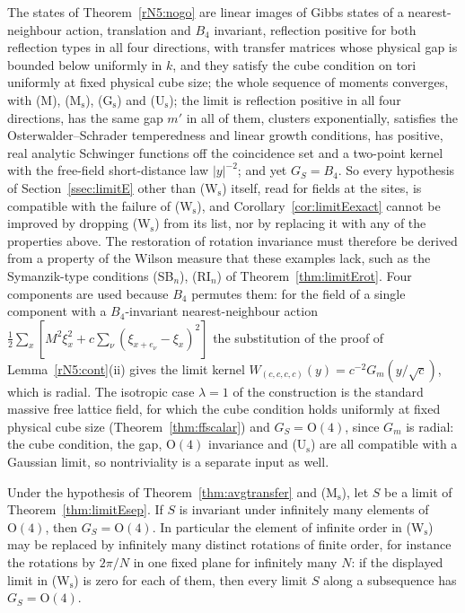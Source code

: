 \begin{remark}\label{rN5:rem:nogo}
The states of Theorem~\ref{rN5:nogo} are linear images of Gibbs states of a
nearest-neighbour action, translation and $B_4$ invariant, reflection
positive for both reflection types in all four directions, with transfer
matrices whose physical gap is bounded below uniformly in $k$, and they
satisfy the cube condition on tori uniformly at fixed physical cube size;
the whole sequence of moments converges, with (M), (M$_{\mathrm s}$),
(G$_{\mathrm s}$) and (U$_{\mathrm s}$); the limit is reflection positive in
all four directions, has the same gap $m'$ in all of them, clusters
exponentially, satisfies the Osterwalder--Schrader temperedness and linear
growth conditions, has positive, real analytic Schwinger functions off the
coincidence set and a two-point kernel with the free-field short-distance
law $|y|^{-2}$; and yet $G_S=B_4$. So every hypothesis of
Section~\ref{ssec:limitE} other than (W$_{\mathrm s}$) itself, read for
fields at the sites, is compatible with the failure of (W$_{\mathrm s}$),
and Corollary~\ref{cor:limitEexact} cannot be improved by dropping
(W$_{\mathrm s}$) from its list, nor by replacing it with any of the
properties above. The restoration of rotation invariance must therefore be
derived from a property of the Wilson measure that these examples lack,
such as the Symanzik-type conditions (SB$_n$), (RI$_n$) of
Theorem~\ref{thm:limitErot}. Four components are used because $B_4$
permutes them: for the field of a single component with a $B_4$-invariant
nearest-neighbour action $\frac12\sum_x[M^2\xi_x^2+c\sum_\nu(\xi_{x+e_\nu}-
\xi_x)^2]$ the substitution of the proof of Lemma~\ref{rN5:cont}(ii) gives
the limit kernel $W_{(c,c,c,c)}(y)=c^{-2}G_m(y/\sqrt c)$, which is radial. The isotropic case
$\lambda=1$ of the construction is the standard massive free lattice field,
for which the cube condition holds uniformly at fixed physical cube size
(Theorem~\ref{thm:ffscalar}) and $G_S=\mathrm O(4)$, since $G_m$ is radial:
the cube condition, the gap, $\mathrm O(4)$ invariance and
(U$_{\mathrm s}$) are all compatible with a Gaussian limit, so
nontriviality is a separate input as well.
\end{remark}

\begin{corollary}\label{rN5:infmany}
Under the hypothesis of Theorem~\textup{\ref{thm:avgtransfer}} and
\textup{(M$_{\mathrm s}$)}, let $S$ be a limit of
Theorem~\textup{\ref{thm:limitEsep}}. If $S$ is invariant under infinitely
many elements of $\mathrm O(4)$, then $G_S=\mathrm O(4)$. In particular the
element of infinite order in \textup{(W$_{\mathrm s}$)} may be replaced by
infinitely many distinct rotations of finite order, for instance the
rotations by $2\pi/N$ in one fixed plane for infinitely many $N$: if the
displayed limit in \textup{(W$_{\mathrm s}$)} is zero for each of them, then
every limit $S$ along a subsequence has $G_S=\mathrm O(4)$.
\end{corollary}

